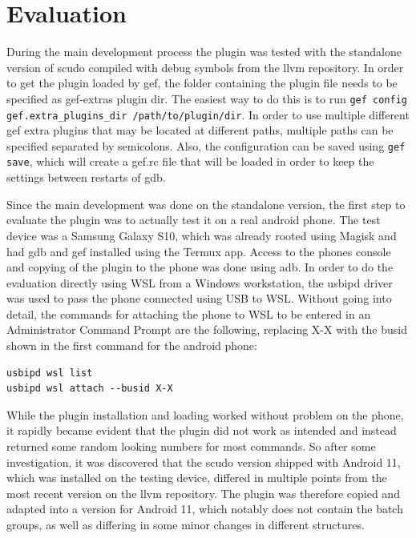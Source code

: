 \documentclass[a4paper,11pt,oneside]{report}
\begin{document}
\chapter{Evaluation}

During the main development process the plugin was tested with the standalone
version of scudo compiled with debug symbols from the llvm repository. In
order to get the plugin loaded by gef, the folder containing the plugin file
needs to be specified as gef-extras plugin dir. The easiest way to do this
is to run \verb|gef config gef.extra_plugins_dir /path/to/plugin/dir|. In order
to use multiple different gef extra plugins that may be located at different
paths, multiple paths can be specified separated by semicolons. Also, the
configuration can be saved using \verb|gef save|, which will create a gef.rc file
that will be loaded in order to keep the settings between restarts of gdb.

Since the main development was done on the standalone version, the first step
to evaluate the plugin was to actually test it on a real android phone. The
test device was a Samsung Galaxy S10, which was already rooted using Magisk
and had gdb and gef installed using the Termux app. Access to the phones
console and copying of the plugin to the phone was done using adb. In order
to do the evaluation directly using WSL from a Windows workstation, the
usbipd driver was used to pass the phone connected using USB to WSL. Without
going into detail, the commands for attaching the phone to WSL to be entered
in an Administrator Command Prompt are the following, replacing X-X with the
busid shown in the first command for the android phone:
\begin{verbatim}
usbipd wsl list
usbipd wsl attach --busid X-X
\end{verbatim}

While the plugin installation and loading worked without problem on the phone, it
rapidly became evident that the plugin did not work as intended and instead
returned some random looking numbers for most commands. So after some
investigation, it was discovered that the scudo version shipped with Android
11, which was installed on the testing device, differed in multiple points
from the most recent version on the llvm repository. The plugin was therefore
copied and adapted into a version for Android 11, which notably does not
contain the batch groups, as well as differing in some minor changes in
different structures.
\end{document}
